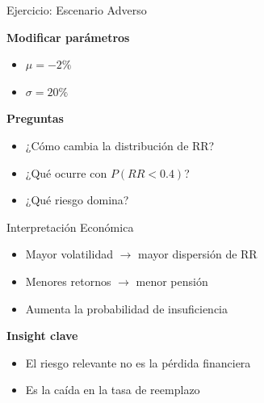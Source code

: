 \documentclass{beamer}
\begin{document}
\begin{frame}{Ejercicio: Escenario Adverso}

\textbf{Modificar parámetros}

\begin{itemize}
\item $\mu = -2\%$
\item $\sigma = 20\%$
\end{itemize}

\vspace{0.3cm}

\textbf{Preguntas}

\begin{itemize}
\item ¿Cómo cambia la distribución de RR?
\item ¿Qué ocurre con $P(RR < 0.4)$?
\item ¿Qué riesgo domina?
\end{itemize}
\end{frame}
\begin{frame}{Interpretación Económica}
\begin{itemize}
\item Mayor volatilidad $\rightarrow$ mayor dispersión de RR
\item Menores retornos $\rightarrow$ menor pensión
\item Aumenta la probabilidad de insuficiencia
\end{itemize}

\vspace{0.3cm}

\textbf{Insight clave}

\begin{itemize}
\item El riesgo relevante no es la pérdida financiera
\item Es la caída en la tasa de reemplazo
\end{itemize}
\end{frame}
\end{document}
